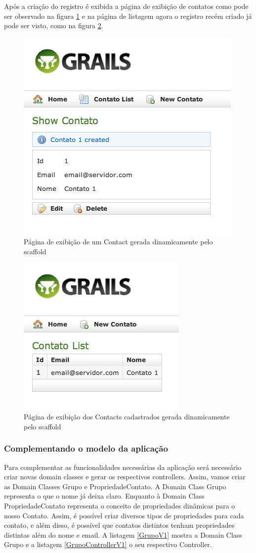 \documentclass[12pt]{article}
\begin{document}
  Após a criação do registro é exibida a página de exibição de contatos como pode 
  ser observado na figura \ref{fig:showContactScaffold} e na página de listagem
  agora o registro recém criado já pode ser visto, como na figura \ref{fig:listContactScaffold}.

   \begin{figure}[h!]
      \centering
      \includegraphics[width=.4\textwidth]{images/showContactScaffold.png}
      \caption{Página de exibição de um Contact gerada dinamicamente pelo scaffold}
      \label{fig:showContactScaffold}
  \end{figure}
  
   \begin{figure}[h!]
      \centering
      \includegraphics[width=.4\textwidth]{images/listContactScaffold.png}
      \caption{Página de exibição dos Contacts cadastrados gerada dinamicamente pelo scaffold}
      \label{fig:listContactScaffold}
  \end{figure}
  
\subsubsection{Complementando o modelo da aplicação}

  Para complementar as funcionalidades necessárias da aplicação será necessário 
  criar novas domain classes e gerar os respectivos controllers. Assim, vamos criar 
  as Domain Classes Grupo e PropriedadeContato. A Domain Class Grupo representa o
  que o nome já deixa claro. Enquanto à Domain Class PropriedadeContato representa
  o conceito de propriedades dinâmicas para o nosso Contato. Assim, é possível
  criar diversos tipos de propriedades para cada contato, e além disso, é possível
  que contatos distintos tenham propriedades distintas além do nome e email. A 
  listagem \ref{GrupoV1} mostra a Domain Class Grupo e a listagem \ref{GrupoControllerV1}
  o seu respectivo Controller. 
  
\end{document}
